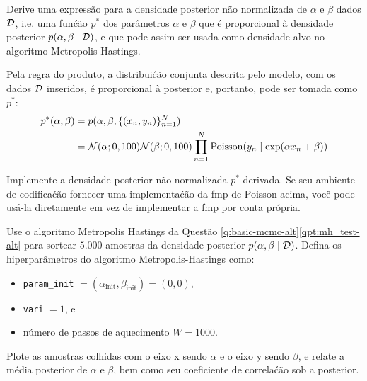\begin{exenumerate}
    
    \item Derive uma express\~ao para a densidade posterior n\~ao normalizada de
    $\alpha$ e $\beta$ dados $\mathcal{D}$, i.e. uma fun\'c\~ao $p^*$ dos
    par\^ametros $\alpha$ e $\beta$ que \'e proporcional \`a
    densidade posterior $p(\alpha, \beta\mid \mathcal{D})$, e que pode assim
    ser usada como densidade alvo no algoritmo Metropolis Hastings.
    
    \begin{solution}
        Pela regra do produto, a distribui\'c\~ao conjunta descrita pelo
        modelo, com os dados $\mathcal{D}$ inseridos, \'e proporcional \`a posterior
        e, portanto, pode ser tomada como $p^*$:
        \begin{align}
            p^*(\alpha, \beta) &= p(\alpha, \beta, \{(x_n,y_n)\}_{n=1}^N ) \\ 
            &= \mathcal{N}(\alpha; 0, 100)\mathcal{N}(\beta; 0, 100)\prod_{n=1}^{N}\mathrm{Poisson}(y_n \mid \text{exp}(\alpha x_n + \beta))
        \end{align}
    \end{solution}
    
    \item Implemente a densidade posterior n\~ao normalizada $p^*$ derivada. Se
    seu ambiente de codifica\'c\~ao fornecer uma implementa\'c\~ao da fmp de Poisson
    acima, voc\^e pode us\'a-la diretamente em vez de implementar a
    fmp por conta pr\'opria.
    
    Use o algoritmo Metropolis Hastings da Quest\~ao
    \ref{q:basic-mcmc-alt}\ref{qpt:mh_test-alt} para sortear $5.000$
    amostras da densidade posterior $p(\alpha, \beta\mid \mathcal{D})$. Defina os
    hiperpar\^ametros do algoritmo Metropolis-Hastings como:
    \begin{itemize}
        \item \lstinline{param_init} $=(\alpha_{\mathrm{init}},\beta_{\mathrm{init}}) = (0,0)$,
        \item \lstinline{vari} $= 1$, e 
        \item n\'umero de passos de aquecimento $W = 1000$.
    \end{itemize}
    
    Plote as amostras colhidas com o eixo x sendo $\alpha$ e o eixo y sendo $\beta$, e relate a m\'edia posterior de $\alpha$ e $\beta$, bem como seu coeficiente de correla\'c\~ao sob a posterior.
    

\end{exenumerate}
